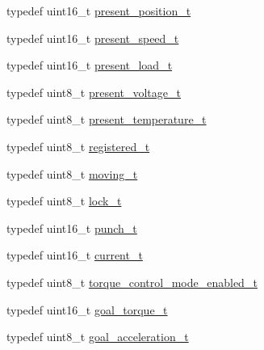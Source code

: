 \begin{DoxyCompactItemize}
\item 
typedef uint16\+\_\+t \hyperlink{structdynamixel_1_1servos_1_1_model_traits_3_01_mx106_01_4_1_1_c_t_a66df83d926066a6bd60894bb38d6ee13}{present\+\_\+position\+\_\+t}
\item 
typedef uint16\+\_\+t \hyperlink{structdynamixel_1_1servos_1_1_model_traits_3_01_mx106_01_4_1_1_c_t_a6869dd84d850b74581d5d11ec2c18995}{present\+\_\+speed\+\_\+t}
\item 
typedef uint16\+\_\+t \hyperlink{structdynamixel_1_1servos_1_1_model_traits_3_01_mx106_01_4_1_1_c_t_a9cf303c2fa27e491772613e7d0208916}{present\+\_\+load\+\_\+t}
\item 
typedef uint8\+\_\+t \hyperlink{structdynamixel_1_1servos_1_1_model_traits_3_01_mx106_01_4_1_1_c_t_a3d8b0c514e9887977f722d0eda6426e9}{present\+\_\+voltage\+\_\+t}
\item 
typedef uint8\+\_\+t \hyperlink{structdynamixel_1_1servos_1_1_model_traits_3_01_mx106_01_4_1_1_c_t_a79673bb4b999953ade394128ec93af1a}{present\+\_\+temperature\+\_\+t}
\item 
typedef uint8\+\_\+t \hyperlink{structdynamixel_1_1servos_1_1_model_traits_3_01_mx106_01_4_1_1_c_t_a25d5736b94a6d9888f8356153dff517c}{registered\+\_\+t}
\item 
typedef uint8\+\_\+t \hyperlink{structdynamixel_1_1servos_1_1_model_traits_3_01_mx106_01_4_1_1_c_t_a565de3f7b8c7055c3a0cad83cfb6858b}{moving\+\_\+t}
\item 
typedef uint8\+\_\+t \hyperlink{structdynamixel_1_1servos_1_1_model_traits_3_01_mx106_01_4_1_1_c_t_a41fcb08dbdd62746705a7c9b4facf9b3}{lock\+\_\+t}
\item 
typedef uint16\+\_\+t \hyperlink{structdynamixel_1_1servos_1_1_model_traits_3_01_mx106_01_4_1_1_c_t_aff12625b70b0f5a14450ed28dd1e8693}{punch\+\_\+t}
\item 
typedef uint16\+\_\+t \hyperlink{structdynamixel_1_1servos_1_1_model_traits_3_01_mx106_01_4_1_1_c_t_ad0c017f193382bc359e9e1d70d64ee09}{current\+\_\+t}
\item 
typedef uint8\+\_\+t \hyperlink{structdynamixel_1_1servos_1_1_model_traits_3_01_mx106_01_4_1_1_c_t_a5ada4a7b5e63dbebc22ac877c849cac0}{torque\+\_\+control\+\_\+mode\+\_\+enabled\+\_\+t}
\item 
typedef uint16\+\_\+t \hyperlink{structdynamixel_1_1servos_1_1_model_traits_3_01_mx106_01_4_1_1_c_t_a6d972bcfd17c808b2d414592f03e93a9}{goal\+\_\+torque\+\_\+t}
\item 
typedef uint8\+\_\+t \hyperlink{structdynamixel_1_1servos_1_1_model_traits_3_01_mx106_01_4_1_1_c_t_aca4ad8bc8875d5e7c51734cc4e9d1c7b}{goal\+\_\+acceleration\+\_\+t}
\end{DoxyCompactItemize}

